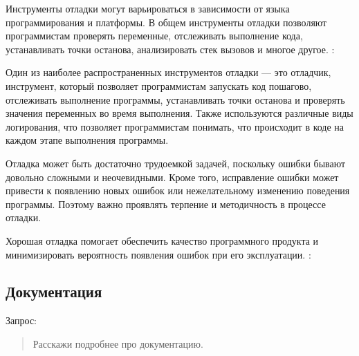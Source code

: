 \documentclass[letterpaper,10pt,russian]{sphinxmanual}
\begin{document}
\sphinxAtStartPar
Инструменты отладки могут варьироваться в зависимости от языка программирования и платформы. В общем инструменты отладки позволяют программистам проверять переменные, отслеживать выполнение кода, устанавливать точки останова, анализировать стек вызовов и многое другое. : 

\sphinxAtStartPar
Один из наиболее распространенных инструментов отладки — это отладчик, инструмент, который позволяет программистам запускать код пошагово, отслеживать выполнение программы, устанавливать точки останова и проверять значения переменных во время выполнения. Также используются различные виды логирования, что позволяет программистам понимать, что происходит в коде на каждом этапе выполнения программы.

\sphinxAtStartPar
Отладка может быть достаточно трудоемкой задачей, поскольку ошибки бывают довольно сложными и неочевидными. Кроме того, исправление ошибки может привести к появлению новых ошибок или нежелательному изменению поведения программы. Поэтому важно проявлять терпение и методичность в процессе отладки.

\sphinxAtStartPar
Хорошая отладка помогает обеспечить качество программного продукта и минимизировать вероятность появления ошибок при его эксплуатации. : 


\subsection{Документация}
\label{\detokenize{educational_materials/stages/content:id15}}
\sphinxAtStartPar
Запрос:
\begin{quote}

\sphinxAtStartPar
Расскажи подробнее про документацию.
\end{quote}
\end{document}
